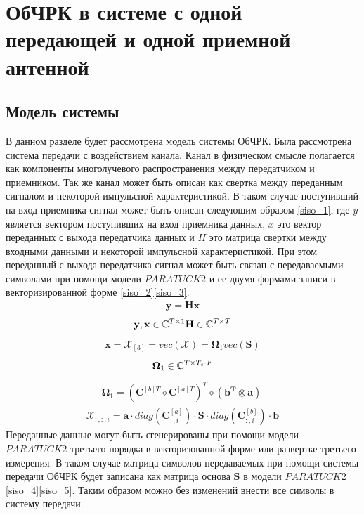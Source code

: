 \chapter{ОбЧРК в системе с одной передающей и одной приемной антенной}
\section{Модель системы}
В данном разделе будет рассмотрена модель системы ОбЧРК. Была рассмотрена система передачи с воздействием канала. Канал в физическом смысле полагается как компоненты многолучевого распространения между передатчиком и приемником\cite{}. Так же канал может быть описан как свертка между переданным сигналом и некоторой импульсной характеристикой. В таком случае поступивший на вход приемника сигнал может быть описан следующим образом \eqref{siso_1}, где $y$ является вектором поступивших на вход приемника данных, $x$ это вектор переданных с выхода передатчика данных и $H$ это матрица свертки между входными данными и некоторой импульсной характеристикой. При этом переданный с выхода передатчика сигнал может быть связан с передаваемыми символами при помощи модели $PARATUCK2$ и ее двумя формами записи в векторизированной форме \eqref{siso_2}\eqref{siso_3}\cite{Book21}. 
\begin{align}
\mathbf{y}=\mathbf{Hx}
\label{siso_1}
\end{align}
\begin{align*}
\mathbf{y,x}\in\mathbb{C}^{T\times 1}
\mathbf{H}\in\mathbb{C}^{T\times T}
\end{align*}
\begin{align}
\mathbf{x}=\mathcal{X}_{[3]}=vec(\mathcal{X})=\mathbf{\Omega}_1 vec(\mathbf{S})
\label{siso_2}
\end{align}
\begin{align*}
\mathbf{\Omega}_1 \in \mathbb{C}^{T\times T_s \cdot F}
\end{align*}
\begin{align}
\mathbf{\Omega}_1=(\mathbf{C}^{[b]T}\diamond \mathbf{C}^{[a]T})^T \diamond (\mathbf{b^T \otimes a}) \
\end{align}
\begin{align}
\mathcal{X}_{:,:,i}=\mathbf{a}\cdot diag(\mathbf{C}^{[a]}_{:,i})\cdot \mathbf{S} \cdot diag(\mathbf{C}^{[b]}_{:,i}) \cdot \mathbf{b} \label{siso_3}
\end{align}
Переданные данные могут быть сгенерированы при помощи модели $PARATUCK2$ третьего порядка в векторизованной форме или развертке третьего измерения. В таком случае матрица символов передаваемых при помощи системы передачи ОбЧРК будет записана как матрица основа $\mathbf{S}$ в модели $PARATUCK2$\cite{Book6}\eqref{siso_4}\eqref{siso_5}. Таким образом можно без изменений внести все символы в систему передачи. 

